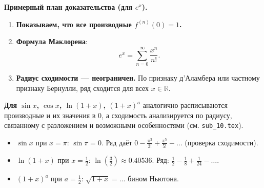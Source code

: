 \medskip


\textbf{Примерный план доказательства (для $e^x$).}
\begin{enumerate}
  \item \textbf{Показываем, что все производные $f^{(n)}(0)=1$.}
  \item \textbf{Формула Маклорена}:
    \[
    e^x = \sum_{n=0}^{\infty} \frac{x^n}{n!}.
    \]
  \item \textbf{Радиус сходимости — неограничен.}  
    По признаку д’Аламбера или частному признаку Бернулли, ряд сходится для всех $x\in \mathbb{R}$.
\end{enumerate}

\textbf{Для \(\sin x\), \(\cos x\), \(\ln(1+x)\), \((1+x)^a\)} аналогично расписываются производные и их значения в 0, а сходимость анализируется по радиусу, связанному с разложением и возможными особенностями (см. \texttt{sub\_10.tex}).

\medskip


\begin{itemize}
  \item \(\sin x\) при $x=\pi$: \(\sin \pi=0\). Ряд даёт $0-\tfrac{\pi^3}{3!}+\tfrac{\pi^5}{5!}-\dots$ (проверка сходимости).  
  \item \(\ln(1+x)\) при $x=\frac12$: \(\ln\left(\tfrac32\right)\approx 0.40536\). Ряд: $\tfrac12-\tfrac{1}{8}+\tfrac{1}{24}-\dots$.  
  \item \((1+x)^a\) при $a=\tfrac12$: \(\sqrt{1+x}=\dots\) бином Ньютона.
\end{itemize}

\medskip

